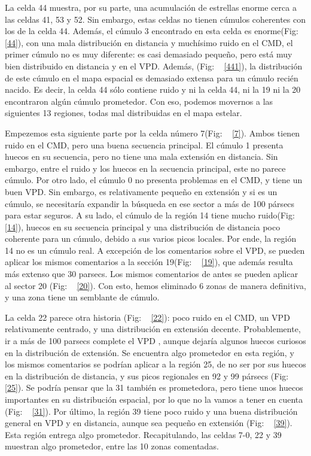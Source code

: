 \documentclass[10pt,twocolumn]{article}
\begin{document}
La celda 44 muestra, por su parte, una acumulación de estrellas enorme cerca a las celdas 41, 53 y 52. Sin embargo, estas celdas no tienen cúmulos
coherentes con los de la celda 44. Además, el cúmulo 3 encontrado en esta celda es enorme(Fig: ~ \ref{44}), con una mala distribución en 
distancia y muchísimo ruido en el CMD, el primer cúmulo no es muy diferente: es casi demasiado pequeño, pero está muy bien distribuido 
en distancia y en el VPD. Además, (Fig: ~ \ref{441}), la distribución de este cúmulo en el mapa espacial es demasiado 
extensa para un  cúmulo recién nacido. Es decir, la celda 44 sólo contiene ruido y ni la celda 44, ni la 19 ni la 20 encontraron
algún cúmulo prometedor. Con eso, podemos movernos a las siguientes 13 regiones, todas mal distribuidas en el mapa estelar.

Empezemos esta siguiente parte por la celda número 7(Fig: ~ \ref{7}). Ambos tienen ruido en el CMD, pero una buena secuencia principal. 
El cúmulo 1 presenta huecos en su secuencia, pero no tiene una mala extensión en distancia. Sin embargo, entre el ruido y los huecos 
en la secuencia principal, este no parece cúmulo. Por otro lado, el cúmulo 0 no presenta problemas en el CMD, y tiene un buen VPD. 
Sin embargo, es relativamente pequeño en extensión y si es un cúmulo, se necesitaría expandir la búsqueda en ese sector a más de
100 pársecs para estar seguros. A su lado, el cúmulo de la región 14 tiene mucho ruido(Fig: ~ \ref{14}), huecos en su secuencia principal 
y una distribución de distancia poco coherente para un cúmulo, debido a sus varios picos locales. 
Por ende, la región 14 no es un cúmulo real. A excepción de los comentarios sobre el VPD, se pueden aplicar los mismos comentarios
a la sección 19(Fig: ~ \ref{19}), que además resulta más extenso que 30 parsecs. Los mismos comentarios de antes se pueden aplicar
al sector 20 (Fig: ~ \ref{20}). Con esto, hemos eliminado 6 zonas de manera definitiva, y una zona tiene un semblante de cúmulo.


La celda 22 parece otra historia (Fig: ~ \ref{22}): poco ruido en el CMD, un VPD relativamente centrado, y una distribución en extensión decente.
Probablemente, ir a más de 100 parsecs complete el VPD , aunque dejaría algunos huecos curiosos en la distribución de extensión. 
Se encuentra algo prometedor en esta región, y los mismos comentarios se podrían aplicar a la región 25, de no ser por sus huecos
en la distribución de distancia, y sus picos regionales en 92 y 99 pársecs (Fig: ~ \ref{25}). Se podría pensar que la 31 
también es prometedora, pero tiene unos huecos importantes en su distribución espacial, por lo que no la vamos a tener en cuenta (Fig: ~ \ref{31}). 
Por último, la región 39 tiene poco ruido y una buena distribución general en VPD y en distancia, aunque sea pequeño en extensión (Fig: ~ \ref{39}).
Esta región entrega algo prometedor. Recapitulando, las celdas 7-0, 22 y 39 muestran algo prometedor, entre las 10 zonas comentadas.
\end{document}
